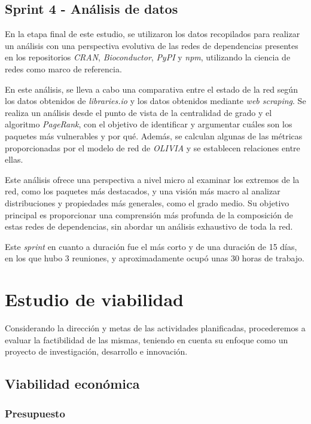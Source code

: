 \subsection{Sprint 4 - Análisis de datos}

En la etapa final de este estudio, se utilizaron los datos recopilados para realizar un análisis con una perspectiva 
evolutiva de las redes de dependencias presentes en los repositorios \textit{CRAN}, \textit{Bioconductor}, \textit{PyPI} 
y \textit{npm}, utilizando la ciencia de redes como marco de referencia.

En este análisis, se lleva a cabo una comparativa entre el estado de la red según los datos obtenidos de \textit{libraries.io} 
y los datos obtenidos mediante \textit{web scraping}. Se realiza un análisis desde el punto de vista de la centralidad de 
grado y el algoritmo \textit{PageRank}, con el objetivo de identificar y argumentar cuáles son los paquetes más vulnerables 
y por qué. Además, se calculan algunas de las métricas proporcionadas por el modelo de red de \textit{OLIVIA} y se establecen 
relaciones entre ellas.

Este análisis ofrece una perspectiva a nivel micro al examinar los extremos de la red, como los paquetes más destacados, y 
una visión más macro al analizar distribuciones y propiedades más generales, como el grado medio. Su objetivo principal es 
proporcionar una comprensión más profunda de la composición de estas redes de dependencias, sin abordar un análisis exhaustivo 
de toda la red.

Este \textit{sprint} en cuanto a duración fue el más corto y de una duración de 15 días, en los que hubo 3 reuniones, y 
aproximadamente ocupó unas 30 horas de trabajo.


\section{Estudio de viabilidad}

Considerando la dirección y metas de las actividades planificadas, procederemos a evaluar la factibilidad de las mismas, 
teniendo en cuenta su enfoque como un proyecto de investigación, desarrollo e innovación.

\subsection{Viabilidad económica}

\subsubsection{Presupuesto}

